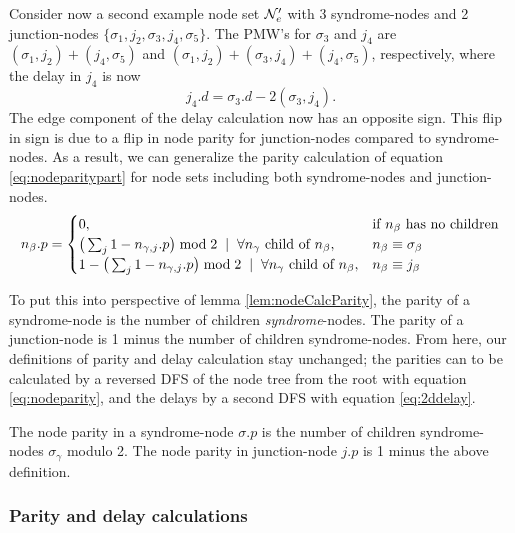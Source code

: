 Consider now a second example node set $\mathcal{N}_e'$ with 3 syndrome-nodes and 2 junction-nodes $\{\sigma_1, j_2, \sigma_3, j_4, \sigma_5\}$. The PMW's for $\sigma_3$ and $j_4$ are $(\sigma_1, j_2) + (j_4, \sigma_5)$ and  $(\sigma_1, j_2) + (\sigma_3, j_4) + (j_4, \sigma_5)$, respectively, where the delay in $j_4$ is now
\begin{equation*}
  j_4.d = \sigma_3.d - 2(\sigma_3, j_4).
\end{equation*}
The edge component of the delay calculation now has an opposite sign. This flip in sign is due to a flip in node parity for junction-nodes compared to syndrome-nodes. As a result, we can generalize the parity calculation of equation \ref{eq:nodeparitypart} for node sets including both syndrome-nodes and junction-nodes.
\begin{equation}\label{eq:nodeparity}
  n_\beta.p =
  \begin{cases}
    0, & \mbox{if $n_\beta$ has no children}  \\
    \big( \sum_{j} 1-n_{\gamma,j}.p \big ) \bmod 2 \hspace{.2cm} | \hspace{.2cm} \forall n_\gamma \mbox{ child of } n_\beta, & n_\beta \equiv \sigma_\beta \\
    1 - \big( \sum_{j} 1-n_{\gamma,j}.p \big ) \bmod 2 \hspace{.2cm} | \hspace{.2cm} \forall n_\gamma \mbox{ child of } n_\beta, & n_\beta \equiv j_\beta
  \end{cases}
\end{equation}

To put this into perspective of lemma \ref{lem:nodeCalcParity}, the parity of a syndrome-node is the number of children \emph{syndrome}-nodes. The parity of a junction-node is 1 minus the number of children syndrome-nodes. From here, our definitions of parity and delay calculation stay unchanged; the parities can to be calculated by a reversed DFS of the node tree from the root with equation \ref{eq:nodeparity}, and the delays by a second DFS with equation \ref{eq:2ddelay}.

\begin{lemma}\label{lem:nodecalc_junction}
  The node parity in a syndrome-node $\sigma.p$ is the number of children syndrome-nodes $\sigma_\gamma$ modulo 2. The node parity in junction-node $j.p$ is 1 minus the above definition.
\end{lemma}

\subsubsection{Parity and delay calculations}

